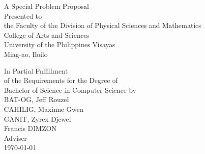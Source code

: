 \begin{titlepage}
\centering


\vspace{1.75cm}
A Special Problem Proposal\\
Presented to\\
the Faculty of the Division of Physical Sciences and Mathematics\\
College of Arts and Sciences\\
University of the Philippines Visayas\\
Miag-ao, Iloilo

\vspace{1.75cm}
In Partial Fulfillment\\
of the Requirements for the Degree of\\
Bachelor of Science in Computer Science
\vspace{1.75cm}
by\\

\vspace{1cm}
BAT-OG, Jeff Rouzel  \\
CAHILIG, Maxinne Gwen  \\
GANIT, Zyrex Djewel  \\

\vspace{1.75cm}
Francis DIMZON \\
Adviser\\

\vspace{1.75cm}
\today
\end{titlepage}
